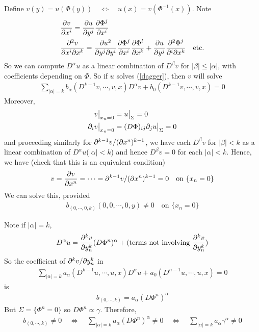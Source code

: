 \documentclass[12pt,a4paper]{report}
\begin{document}
Define $v(y) = u(\Phi(y)) \quad \Leftrightarrow \quad u(x) = v(\Phi^{-1}(x))$. Note
\begin{align*}
&\frac{\partial v}{\partial x^i} = \frac{\partial u}{\partial y^j} \frac{\partial \Phi^j}{\partial x^i} \\
&\frac{\partial^2 v}{\partial x^i \partial x^k} = \frac{\partial u^2}{\partial y^j \partial y^i} \frac{\partial \Phi^j}{\partial x^i} \frac{\partial \Phi^l}{\partial x^k} + \frac{\partial u}{\partial y^j} \frac{\partial^2 \Phi^j}{\partial^i \partial x^k} \quad \text{etc.}
\end{align*}
So we can compute $D^{\alpha} u$ as a linear combination of $D^{\beta}v$ for $|\beta| \leq |\alpha|$, with coefficients depending on $\Phi$. So if $u$ solves (\ref{dagger}), then $v$ will solve 
\begin{align*}
\sum_{|\alpha| =k} b_{\alpha}(D^{k-1}v, \cdots, v, x)D^{\alpha}v + b_0 (D^{k-1}v, \cdots, v, x) =0
\end{align*}
Moreover,
\begin{align*}
v \big|_{x_n =0} &= u \big|_{\Sigma} = 0 \\
\partial_i v \big|_{x_n =0} &= (D\Phi)_{ij} \partial_j u \big|_{\Sigma} = 0 
\end{align*}
and proceeding similarly for $\partial^{k-1} v / (\partial x^n)^{k-1}$, we have each $D^{\beta} v$ for $|\beta|<k$ as a linear combination of $D^{\alpha}u$($|\alpha|<k$) and hence $D^{\beta} v= 0$ for each $|\alpha|<k$. Hence, we have (check that this is an equivalent condition)
\begin{align*}
v = \frac{\partial v}{\partial x^n} = \cdots = \partial^{k-1} v / (\partial x^n)^{k-1} =0 \quad \text{on } \{ x_n =0 \}
\end{align*}
We can solve this, provided
\begin{align*}
b_{(0,\cdots,0, k)}(0,0, \cdots, 0, y) \neq 0 \quad \text{on } \{ x_n =0 \}
\end{align*}

Note if $|\alpha | = k$,
\begin{align*}
D^{\alpha}u = \frac{\partial^k v}{\partial y^k_n} (D\Phi^n)^{\alpha} + (\text{terms not involving } \frac{\partial^k v}{\partial y^k_n})
\end{align*}
So the coefficient of $\partial^k v / \partial y^k_n$ in
\begin{align*}
\sum_{|\alpha| =k} a_{\alpha}(D^{k-1}u, \cdots, u,x)D^{\alpha} u + a_0(D^{n-1}u, \cdots, u,x) =0
\end{align*}
is
\begin{align*}
b_{(0,\cdots,k)} = a_{\alpha}(D\Phi^n)^{\alpha}
\end{align*}
But $\Sigma = \{\Phi^n =0\}$ so $D\Phi^n \propto \gamma$. Therefore,
\begin{align*}
b_{(0,\cdots,k)} \neq 0 \quad \Leftrightarrow \quad \sum_{|\alpha|=k} a_{\alpha} (D\Phi^n)^{\alpha} \neq 0  \quad \Leftrightarrow \quad \sum_{|\alpha|=k} a_{\alpha} \gamma^{\alpha} \neq 0
\end{align*}
\s
\end{document}
